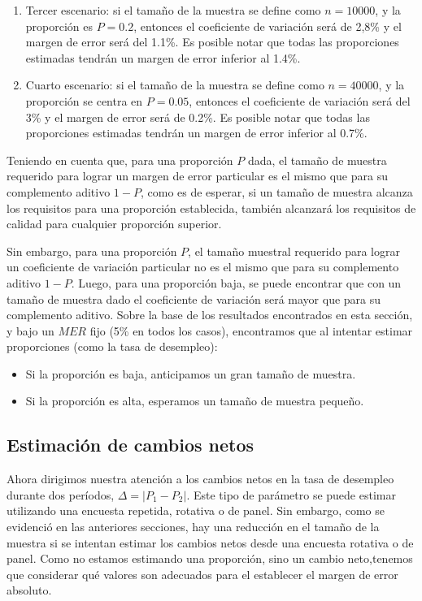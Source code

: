 \documentclass[
  12pt,
]{book}
\providecommand{\tightlist}{%
  \setlength{\itemsep}{0pt}\setlength{\parskip}{0pt}}
\begin{document}
\begin{enumerate}
\def\labelenumi{\arabic{enumi}.}
\setcounter{enumi}{2}
\item
  Tercer escenario: si el tamaño de la muestra se define como \(n = 10000\), y la proporción es \(P=0.2\), entonces el coeficiente de variación será de 2,8\% y el margen de error será del 1.1\%. Es posible notar que todas las proporciones estimadas tendrán un margen de error inferior al 1.4\%.
\item
  Cuarto escenario: si el tamaño de la muestra se define como \(n = 40000\), y la proporción se centra en \(P=0.05\), entonces el coeficiente de variación será del 3\% y el margen de error será de 0.2\%. Es posible notar que todas las proporciones estimadas tendrán un margen de error inferior al 0.7\%.
\end{enumerate}

Teniendo en cuenta que, para una proporción \(P\) dada, el tamaño de muestra requerido para lograr un margen de error particular es el mismo que para su complemento aditivo \(1-P\), como es de esperar, si un tamaño de muestra alcanza los requisitos para una proporción establecida, también alcanzará los requisitos de calidad para cualquier proporción superior.

Sin embargo, para una proporción \(P\), el tamaño muestral requerido para lograr un coeficiente de variación particular no es el mismo que para su complemento aditivo \(1-P\). Luego, para una proporción baja, se puede encontrar que con un tamaño de muestra dado el coeficiente de variación será mayor que para su complemento aditivo. Sobre la base de los resultados encontrados en esta sección, y bajo un \(MER\) fijo (5\% en todos los casos), encontramos que al intentar estimar proporciones (como la tasa de desempleo):

\begin{itemize}
\tightlist
\item
  Si la proporción es baja, anticipamos un gran tamaño de muestra.
\item
  Si la proporción es alta, esperamos un tamaño de muestra pequeño.
\end{itemize}

\hypertarget{estimaciuxf3n-de-cambios-netos}{%
\subsection{Estimación de cambios netos}\label{estimaciuxf3n-de-cambios-netos}}

Ahora dirigimos nuestra atención a los cambios netos en la tasa de desempleo durante dos períodos, \(\Delta= |P_{1}-P_{2}|\). Este tipo de parámetro se puede estimar utilizando una encuesta repetida, rotativa o de panel. Sin embargo, como se evidenció en las anteriores secciones, hay una reducción en el tamaño de la muestra si se intentan estimar los cambios netos desde una encuesta rotativa o de panel. Como no estamos estimando una proporción, sino un cambio neto,tenemos que considerar qué valores son adecuados para el establecer el margen de error absoluto.
\end{document}
